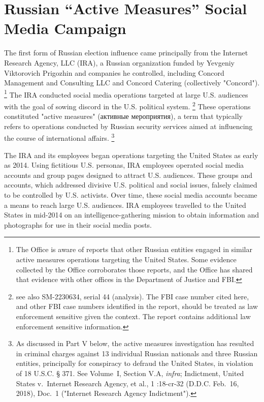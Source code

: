 \section{Russian ``Active Measures'' Social Media Campaign}

The first form of Russian election influence came principally from the Internet Research Agency, LLC (IRA), a Russian organization funded by Yevgeniy Viktorovich Prigozhin and companies he controlled, including Concord Management and Consulting LLC and Concord Catering (collectively "Concord").%
\footnote{The Office is aware of reports that other Russian entities engaged in similar active measures operations targeting the United States.
Some evidence collected by the Office corroborates those reports, and the Office has shared that evidence with other offices in the Department of Justice and FBI.}
The IRA conducted social media operations targeted at large U.S. audiences with the goal of sowing discord in the U.S. political system.%
\footnote{
see also SM-2230634, serial 44 (analysis).
The FBI case number cited here, and other FBI case numbers identified in the report, should be treated as law enforcement sensitive given the context.
The report contains additional law enforcement sensitive information.}
These operations constituted "active measures" (активные мероприятия), a term that typically refers to operations conducted by Russian security services aimed at influencing the course of international affairs.%
\footnote{As discussed in Part V below, the active measures investigation has resulted in criminal charges against 13 individual Russian nationals and three Russian entities, principally for conspiracy to defraud the United States, in violation of 18 U.S.C. § 371.
See Volume~I, Section V.A, \textit{infra}; Indictment, United States v.\ Internet Research Agency, et al., 1 :18-cr-32 (D.D.C. Feb.~16, 2018), Doc.~1 ("Internet Research Agency Indictment").}

The IRA and its employees began operations targeting the United States as early as 2014.
Using fictitious U.S. personas, IRA employees operated social media accounts and group pages designed to attract U.S. audiences.
These groups and accounts, which addressed divisive U.S. political and social issues, falsely claimed to be controlled by U.S. activists.
Over time, these social media accounts became a means to reach large U.S. audiences.
IRA employees travelled to the United States in mid-2014 on an intelligence-gathering mission to obtain information and photographs for use in their social media posts.

